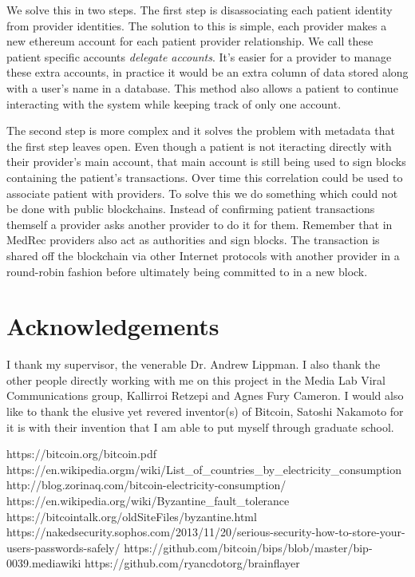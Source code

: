 \documentclass[a4paper]{article}
\begin{document}
We solve this in two steps. The first step is disassociating each patient identity from provider identities. The solution to this is simple, each provider makes a new ethereum account for each patient provider relationship. We call these patient specific accounts \textit{delegate accounts}. It's easier for a provider to manage these extra accounts, in practice it would be an extra column of data stored along with a user's name in a database. This method also allows a patient to continue interacting with the system while keeping track of only one account.

The second step is more complex and it solves the problem with metadata that the first step leaves open. Even though a patient is not iteracting directly with their provider's main account, that main account is still being used to sign blocks containing the patient's transactions. Over time this correlation could be used to associate patient with providers. To solve this we do something which could not be done with public blockchains. Instead of confirming patient transactions themself a provider asks another provider to do it for them. Remember that in MedRec providers also act as authorities and sign blocks. The transaction is shared off the blockchain via other Internet protocols with another provider in a round-robin fashion before ultimately being committed to in a new block.

\section{Acknowledgements}

I thank my supervisor, the venerable Dr. Andrew Lippman. I also thank the other people directly working with me on this project in the Media Lab Viral Communications group, Kallirroi Retzepi and Agnes Fury Cameron. I would also like to thank the elusive yet revered inventor(s) of Bitcoin, Satoshi Nakamoto for it is with their invention that I am able to put myself through graduate school.

\newpage

\begin{thebibliography}{9}
 https://bitcoin.org/bitcoin.pdf
 https://en.wikipedia.orgm/wiki/List\_of\_countries\_by\_electricity\_consumption
 http://blog.zorinaq.com/bitcoin-electricity-consumption/
 https://en.wikipedia.org/wiki/Byzantine\_fault\_tolerance
 https://bitcointalk.org/oldSiteFiles/byzantine.html
 https://nakedsecurity.sophos.com/2013/11/20/serious-security-how-to-store-your-users-passwords-safely/
\bibitem https://github.com/bitcoin/bips/blob/master/bip-0039.mediawiki
\bibitem https://github.com/ryancdotorg/brainflayer
\end{thebibliography}



\newpage
\end{document}
